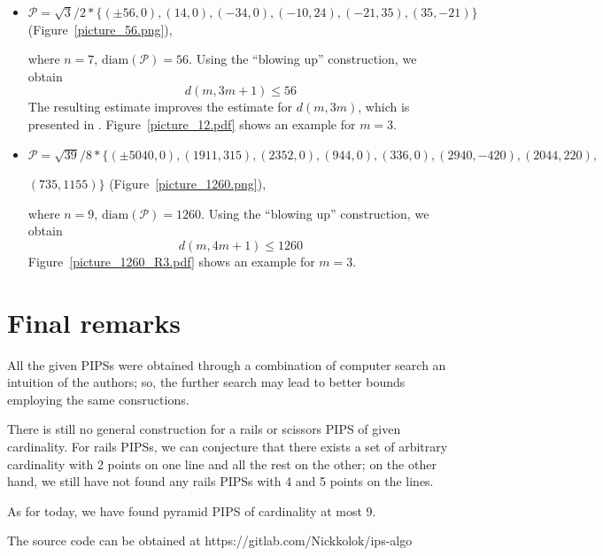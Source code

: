 \documentclass[12pt]{article}
\theoremstyle{theorem}
\theoremstyle{dfn}
\theoremstyle{remark}
\begin{document}
\begin{itemize}
\setlength{\itemsep}{-1mm}


\item
$\mathcal{P}=\sqrt{3}/{2} * \{ (\pm 56, 0),
(14, 0),
(-34, 0),
(-10, 24),
(-21 , 35),
(35, -21)\}
$
(Figure~\ref{picture_56.png}),

where $n = 7$, $\operatorname{diam(\mathcal{P})} = 56$. Using the ``blowing up''
construction, we obtain
\begin{equation}\label{result2}
d(m, 3m + 1) \leq 56
\end{equation}
The resulting estimate improves the estimate for $d(m, 3m)$, which is presented
in \cite{kemnitz1988punktmengen}. Figure~\ref{picture_12.pdf} shows an example
for $m = 3$.


\item
$\mathcal{P}=\sqrt{39}/{8} * \{ (\pm 5040, 0),
(1911, 315),
(2352, 0),
(944, 0),
(336, 0),
(2940, -420),
(2044, 220),
$

$
(735, 1155)\}
$
(Figure~\ref{picture_1260.png}),

where $n = 9$, $\operatorname{diam(\mathcal{P})} = 1260$. Using the ``blowing up''
construction, we obtain
\begin{equation}\label{result3}
d(m, 4m + 1) \leq 1260
\end{equation}
Figure~\ref{picture_1260_R3.pdf} shows an example for $m = 3$.

\end{itemize}

\section{Final remarks}
All the given PIPSs were obtained through a combination of computer search an intuition of the authors;
so, the further search may lead to better bounds employing the same consructions.

There is still no general construction for a rails or scissors PIPS of given cardinality.
For rails PIPSs, we can conjecture that there exists a set of arbitrary cardinality with 2 points on one line
and all the rest on the other;
on the other hand, we still have not found any rails PIPSs with 4 and 5 points on the lines.

As for today, we have found pyramid PIPS of cardinality at most 9.

The source code can be obtained at https://gitlab.com/Nickkolok/ips-algo


\end{document}
